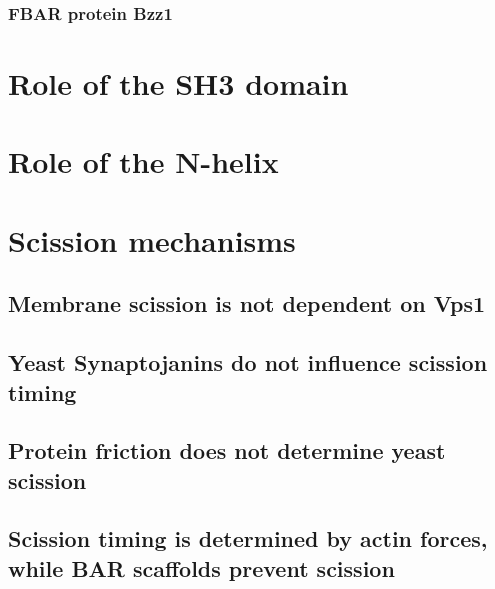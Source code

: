 			\subsubsection{FBAR protein Bzz1}
				
\section{Role of the SH3 domain}		
\section{Role of the N-helix}			
		
\section{Scission mechanisms}

	\subsection{Membrane scission is not dependent on Vps1}
	\subsection{Yeast Synaptojanins do not influence scission timing}
	\subsection{Protein friction does not determine yeast scission }
	\subsection{Scission timing is determined by actin forces, while BAR scaffolds prevent scission}